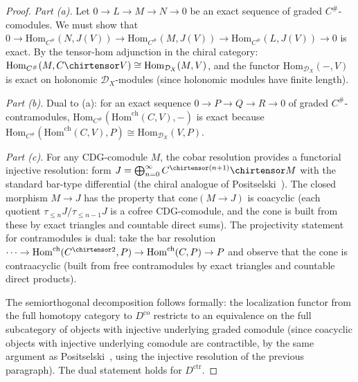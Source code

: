 \begin{proof}
\emph{Part (a).}
Let $0 \to L \to M \to N \to 0$ be an exact sequence of graded
$C^{\#}$-comodules. We must show that
$0 \to \mathrm{Hom}_{C^{\#}}(N, J(V)) \to \mathrm{Hom}_{C^{\#}}(M, J(V))
\to \mathrm{Hom}_{C^{\#}}(L, J(V)) \to 0$
is exact. By the tensor-hom adjunction in the chiral category:
$\mathrm{Hom}_{C^{\#}}(M, C \chirtensor V)
\cong \mathrm{Hom}_{\mathcal{D}_X}(M, V)$,
and the functor $\mathrm{Hom}_{\mathcal{D}_X}(-, V)$ is exact
on holonomic $\mathcal{D}_X$-modules (since holonomic modules have
finite length).

\emph{Part (b).}
Dual to (a): for an exact sequence
$0 \to P \to Q \to R \to 0$ of graded $C^{\#}$-contramodules,
$\mathrm{Hom}_{C^{\#}}(\mathrm{Hom}^{\mathrm{ch}}(C, V), -)$
is exact because
$\mathrm{Hom}_{C^{\#}}(\mathrm{Hom}^{\mathrm{ch}}(C, V), P)
\cong \mathrm{Hom}_{\mathcal{D}_X}(V, P)$.

\emph{Part (c).}
For any CDG-comodule $M$, the cobar resolution provides a
functorial injective resolution: form
$J = \bigoplus_{n=0}^{\infty} C^{\chirtensor (n+1)} \chirtensor M$
with the standard bar-type differential (the chiral analogue of
Positselski~\cite[\S4.4, proof of Theorem]{Positselski11}).
The closed morphism $M \to J$ has the property that
$\mathrm{cone}(M \to J)$ is coacyclic (each quotient
$\tau_{\leq n}J / \tau_{\leq n-1}J$ is a cofree CDG-comodule, and
the cone is built from these by exact triangles and countable direct
sums). The projectivity statement for contramodules is dual:
take the bar resolution
$\cdots \to \mathrm{Hom}^{\mathrm{ch}}(C^{\chirtensor 2}, P)
\to \mathrm{Hom}^{\mathrm{ch}}(C, P) \to P$
and observe that the cone is contraacyclic (built from free
contramodules by exact triangles and countable direct products).

The semiorthogonal decomposition follows formally: the localization
functor from the full homotopy category to $D^{\mathrm{co}}$
restricts to an equivalence on the full subcategory of objects with
injective underlying graded comodule (since coacyclic objects with
injective underlying comodule are contractible, by the same argument as
Positselski~\cite[\S4.4]{Positselski11}, using the injective
resolution of the previous paragraph). The dual statement holds for
$D^{\mathrm{ctr}}$.
\end{proof}


